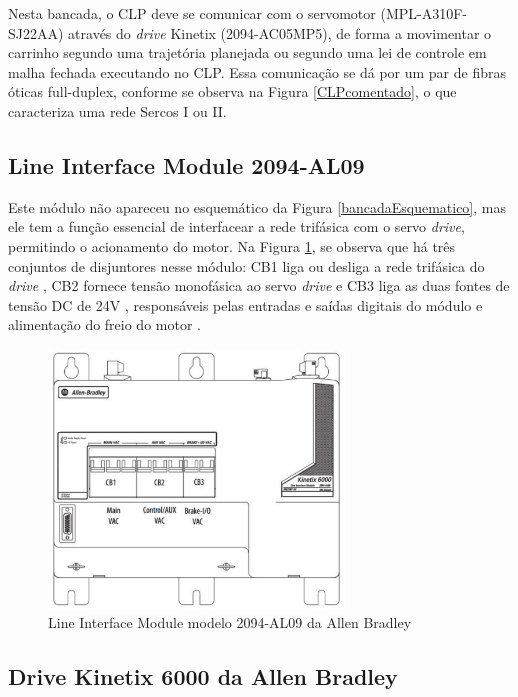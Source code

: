 Nesta bancada, o CLP deve se comunicar com o servomotor (MPL-A310F-SJ22AA) através do \textit{drive} Kinetix (2094-AC05MP5), de forma a movimentar o carrinho segundo uma trajetória planejada ou segundo uma lei de controle em malha fechada executando no CLP. Essa comunicação se dá por um par de fibras óticas full-duplex, conforme se observa na Figura \ref{CLPcomentado}, o que caracteriza uma rede Sercos I ou II.

\subsection{Line Interface Module 2094-AL09}

Este módulo não apareceu no esquemático da Figura \ref{bancadaEsquematico}, mas ele tem a função essencial de interfacear a rede trifásica com o servo \textit{drive}, permitindo o acionamento do motor. Na Figura \ref{LineInterfaceModule}, se observa que há três conjuntos de disjuntores nesse módulo: CB1 \textendash{} liga ou desliga a rede trifásica do \textit{drive}  \textendash{}, CB2 \textendash{} fornece tensão monofásica ao servo \textit{drive} \textendash{} e CB3 \textendash{} liga as duas fontes de tensão DC de 24V \textendash{}, responsáveis pelas entradas e saídas digitais do módulo e alimentação do freio do motor \cite{redytton}.

\begin{figure}[!ht]
  \centering
    \includegraphics[width=0.7\textwidth]{figs/fundamentos/LineInterfaceModule}
    \caption{Line Interface Module modelo 2094-AL09 da Allen Bradley \cite{redytton}\label{LineInterfaceModule}}
\end{figure}

\subsection{Drive Kinetix 6000 da Allen Bradley}

